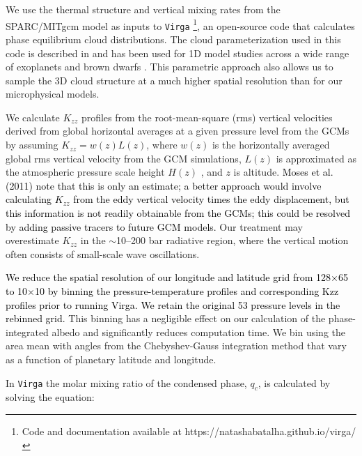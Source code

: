 \documentclass[twocolumn]{aastex63}
\begin{document}
We use the thermal structure and vertical mixing rates from the SPARC/MITgcm model as inputs to \texttt{Virga} \citep{virga}\footnote{Code and documentation available at https://natashabatalha.github.io/virga/}, an open-source code that calculates phase equilibrium cloud distributions.  The cloud parameterization used in this code is described in \citet{ackerman2001} and has been used for 1D model studies across a wide range of exoplanets and brown dwarfs \citep[e.g.][]{fortney2006,marley2010,morley2015}. This parametric approach also allows us to sample the 3D cloud structure at a much higher spatial resolution than for our microphysical models. 

We calculate $K_{zz}$ profiles from the root-mean-square (rms) vertical velocities derived from global horizontal averages at a given pressure level from the GCMs by assuming $K_{zz} = w(z)L(z)$, where $w(z)$ is the horizontally averaged global rms vertical velocity from the GCM simulations,  $L(z)$ is approximated as the atmospheric pressure scale height $H(z)$ \citep[but could be a fraction of $H(z)$; see][]{smith1998}, and $z$ is altitude. \textcolor{black}{Moses et al. (2011) note that this is only an estimate; a better approach would involve calculating $K_{zz}$ from the eddy vertical velocity times the eddy displacement, but this information is not readily obtainable from the GCMs; this could be resolved by adding passive tracers to future GCM models.} Our treatment may overestimate $K_{zz}$ in the $\sim$10–200 bar radiative region, where the vertical motion often consists of small-scale wave oscillations. 

\textcolor{black}{We reduce the spatial resolution of our longitude and latitude grid from 128$\times$65 to 10$\times$10 by binning the pressure-temperature profiles and corresponding Kzz profiles prior to running Virga. We retain the original 53 pressure levels in the rebinned grid.} 
This binning has a negligible effect on our calculation of the phase-integrated albedo and significantly reduces computation time. We bin using the area mean with angles from the Chebyshev-Gauss integration method that vary as a function of planetary latitude and longitude. 

In \texttt{Virga} the molar mixing ratio of the condensed phase, $q_c$, is calculated by solving the equation:
\end{document}
